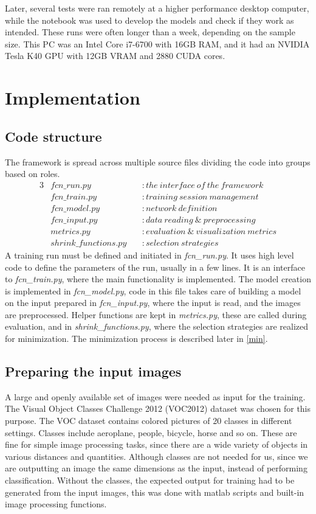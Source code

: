 \documentclass[12pt]{report}
\begin{document}
Later, several tests were ran remotely at a higher performance desktop computer, while the notebook was used to develop the models and check if they work as intended. These runs were often longer than a week, depending on the sample size. This PC was an Intel Core i7-6700 with 16GB RAM, and it had an NVIDIA Tesla K40 GPU with 12GB VRAM and 2880 CUDA cores.
\chapter{Implementation}
\section{Code structure}
The framework is spread across multiple source files dividing the code into groups based on roles.
\begin{alignat*}{3}
	&fcn\_run.py\          &&: the\ interface\ of\ the\ framework \\
	&fcn\_train.py\        &&: training\ session\ management \\
	&fcn\_model.py\        &&: network\ definition \\
	&fcn\_input.py\        &&: data\ reading\ \& \ preprocessing \\
	&metrics.py\           &&: evaluation\ \&\ visualization\ metrics \\
	&shrink\_functions.py\ &&: selection\ strategies
\end{alignat*}
A training run must be defined and initiated in \textit{fcn\_run.py}. It uses high level code to define the parameters of the run, usually in a few lines. It is an interface to \textit{fcn\_train.py}, where the main functionality is implemented. The model creation is implemented in \textit{fcn\_model.py}, code in this file takes care of building a model on the input prepared in \textit{fcn\_input.py}, where the input is read, and the images are preprocessed. Helper functions are kept in \textit{metrics.py}, these are called during evaluation, and in \textit{shrink\_functions.py}, where the selection strategies are realized for minimization. The minimization process is described later in \ref{min}.
\section{Preparing the input images}
A large and openly available set of images were needed as input for the training. The Visual Object Classes Challenge 2012 (VOC2012) dataset \cite{pascal-voc-2012} was chosen for this purpose. The VOC dataset contains colored pictures of 20 classes in different settings. Classes include aeroplane, people, bicycle, horse and so on. These are fine for simple image processing tasks, since there are a wide variety of objects in various distances and quantities. Although classes are not needed for us, since we are outputting an image the same dimensions as the input, instead of performing classification. Without the classes, the expected output for training had to be generated from the input images, this was done with matlab scripts and built-in image processing functions.
\end{document}
